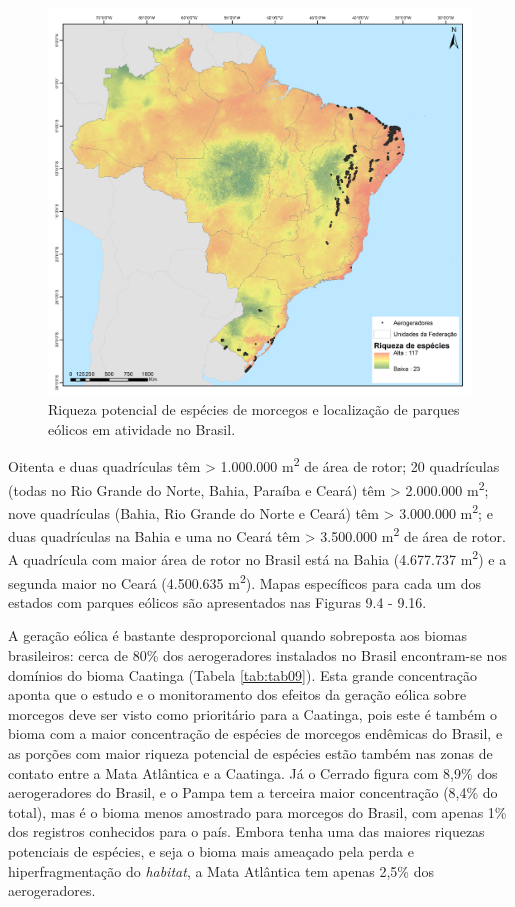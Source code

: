 \documentclass[
  oneside]{scrbook}
\begin{document}
\begin{figure}[H]

{\centering \includegraphics[width=0.75\linewidth]{imagens/cap09/Figura_9.3} 

}

\caption{Riqueza potencial de espécies de morcegos e localização de parques eólicos em atividade no Brasil.}\label{fig:69}
\end{figure}

Oitenta e duas quadrículas têm \textgreater{} 1.000.000 m\textsuperscript{2} de área de rotor; 20 quadrículas (todas no Rio Grande do Norte, Bahia, Paraíba e Ceará) têm \textgreater{} 2.000.000 m\textsuperscript{2}; nove quadrículas (Bahia, Rio Grande do Norte e Ceará) têm \textgreater{} 3.000.000 m\textsuperscript{2}; e duas quadrículas na Bahia e uma no Ceará têm \textgreater{} 3.500.000 m\textsuperscript{2} de área de rotor. A quadrícula com maior área de rotor no Brasil está na Bahia (4.677.737 m\textsuperscript{2}) e a segunda maior no Ceará (4.500.635 m\textsuperscript{2}). Mapas específicos para cada um dos estados com parques eólicos são apresentados nas Figuras 9.4 - 9.16.

A geração eólica é bastante desproporcional quando sobreposta aos biomas brasileiros: cerca de 80\% dos aerogeradores instalados no Brasil encontram-se nos domínios do bioma Caatinga (Tabela \ref{tab:tab09}). Esta grande concentração aponta que o estudo e o monitoramento dos efeitos da geração eólica sobre morcegos deve ser visto como prioritário para a Caatinga, pois este é também o bioma com a maior concentração de espécies de morcegos endêmicas do Brasil, e as porções com maior riqueza potencial de espécies estão também nas zonas de contato entre a Mata Atlântica e a Caatinga. Já o Cerrado figura com 8,9\% dos aerogeradores do Brasil, e o Pampa tem a terceira maior concentração (8,4\% do total), mas é o bioma menos amostrado para morcegos do Brasil, com apenas 1\% dos registros conhecidos para o país. Embora tenha uma das maiores riquezas potenciais de espécies, e seja o bioma mais ameaçado pela perda e hiperfragmentação do \emph{habitat}, a Mata Atlântica tem apenas 2,5\% dos aerogeradores.
\end{document}
